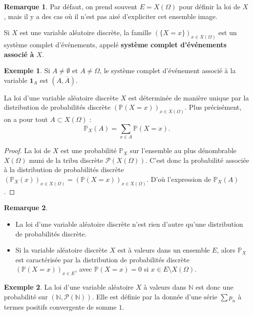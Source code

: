 \documentclass[french]{article}
\renewcommand{\P}{\mathbb{P}}
\newcommand{\N}{\mathbb{N}}
\theoremstyle{plain}
\theoremstyle{definition}
\newtheorem*{ex}{Exemple}
\newtheorem*{rmq}{Remarque}
\theoremstyle{remark}
\begin{document}
\begin{rmq}
	Par défaut, on prend souvent $E=X(\Omega)$ pour définir la loi de $X$, mais il y a des cas où il n'est pas aisé d'expliciter cet ensemble image.
\end{rmq}

\begin{thm}{}%
	Si $X$ est une variable aléatoire discrète, la famille $(\{X=x\})_{x\in X(\Omega)}$ est un système complet d'événements, appelé \textbf{système complet d'événements associé à $X$}.
\end{thm}

\begin{ex}
	Si $A\ne\emptyset$ et $A\ne\Omega$, le système complet d'événement associé à la variable $\textbf{1}_A$ est $(A,\overline{A})$.
\end{ex}

\begin{thm}{}%
	La loi d'une variable aléatoire discrète $X$ est déterminée de manière unique par la distribution de probabilités discrète $(\P(X=x))_{x\in X(\Omega)}$. Plus précisément, on a pour tout $A\subset X(\Omega)$ :
	$$\P_X(A)=\sum_{x\in A}\P(X=x).$$
\end{thm}

\begin{proof}
	La loi de $X$ est une probabilité $\P_X$ sur l'ensemble au plus dénombrable $X(\Omega)$ muni de la tribu discrète $\mathcal{P}(X(\Omega))$. C'est donc la probabilité associée à la distribution de probabilités discrète $(\P_X(x))_{x\in X(\Omega)}=(\P(X=x))_{x\in X(\Omega)}$. D'où l'expression de $\P_X(A)$.
\end{proof}

\begin{rmq}
	\begin{itemize}
		\item La loi d'une variable aléatoire discrète n'est rien d'autre qu'une distribution de probabilités discrète.
		\item Si la variable aléatoire discrète $X$ est à valeurs dans un ensemble $E$, alors $\P_X$ est caractérisée par la distribution de probabilités discrète $(\P(X=x))_{x\in E}$, avec $\P(X=x)=0$ si $x\in E\setminus X(\Omega)$.
	\end{itemize}
\end{rmq}

\begin{ex}
	La loi d'une variable aléatoire $X$ à valeurs dans $\N$ est donc une probabilité sur $(\N,\mathcal{P}(\N))$. Elle est définie par la donnée d'une série $\displaystyle\sum p_n$ à termes positifs convergente de somme $1$.
\end{ex}
\end{document}

